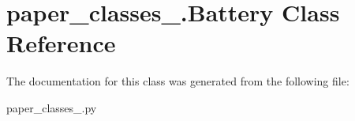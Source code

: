 \hypertarget{classpaper__classes__2_1_1_battery}{}\section{paper\+\_\+classes\+\_.\+Battery Class Reference}
\label{classpaper__classes__2_1_1_battery}


The documentation for this class was generated from the following file\+:\begin{DoxyCompactItemize}
\item 
paper\+\_\+classes\+\_.\+py\end{DoxyCompactItemize}
